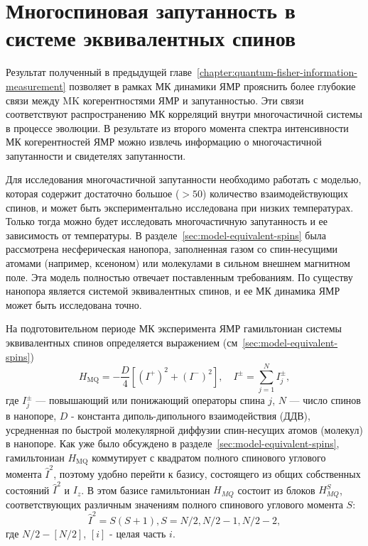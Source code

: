 \chapter{Многоспиновая запутанность в системе эквивалентных спинов}
\label{chapter:manyparticle-entanglement-in-nanopore}
%



Результат полученный в предыдущей главе~\ref{chapter:quantum-fisher-information-measurement}
позволяет в рамках МК динамики ЯМР прояснить более глубокие связи между MK когерентностями ЯМР и запутанностью.
Эти связи соответствуют распространению МК корреляций внутри многочастичной системы в процессе эволюции.
В результате из второго момента спектра интенсивности МК когерентностей ЯМР
можно извлечь информацию о многочастичной запутанности и свидетелях запутанности.

Для исследования многочастичной запутанности необходимо работать с моделью,
которая содержит достаточно большое ($>50$) количество взаимодействующих спинов,
и может быть экспериментально исследована при низких температурах.
Только тогда можно будет исследовать многочастичную запутанность и ее зависимость от температуры.
В разделе~\ref{sec:model-equivalent-spins} была рассмотрена несферическая нанопора,
заполненная газом со спин-несущими атомами (например, ксеноном) или молекулами в сильном внешнем магнитном поле.
Эта модель полностью отвечает поставленным требованиям.
По существу нанопора является системой эквивалентных спинов,
и ее МК динамика ЯМР может быть исследована точно.

На подготовительном периоде МК эксперимента ЯМР гамильтониан системы эквивалентных спинов
определяется выражением (см~\ref{sec:model-equivalent-spins})
\begin{equation}\label{eq:mq-hamiltoninan-equivalent-spins}
  H_\mathrm{MQ} = - \dfrac{D}{4} \left[
    \left( I^{+} \right)^2 + \left( I^{-} \right)^2
  \right],
  \quad
  I^{\pm} = \sum\limits_{j=1}^{N} I^{\pm}_j,
\end{equation}
где $I^{\pm}_{j}$ --- повышающий или понижающий операторы спина $j$,
$N$ --- число спинов в нанопоре,
$D$ - константа диполь-дипольного взаимодействия (ДДВ),
усредненная по быстрой молекулярной диффузии спин-несущих атомов (молекул) в нанопоре.
Как уже было обсуждено в разделе~\ref{sec:model-equivalent-spins},
гамильтониан $H_\mathrm{MQ}$
коммутирует с квадратом полного спинового углового момента $\hat I^2$,
поэтому удобно перейти к базису,
состоящего из общих собственных состояний $\hat I^2$ и $I_z$.
В этом базисе гамильтониан $H_{MQ}$ состоит из блоков $H_{MQ}^S$, соответствующих различным значениям полного спинового углового момента $S$:
\begin{equation}
  \hat I^2 = S(S+1), S = N/2, N/2-1, N/2-2,
\end{equation}
где
$N/2 - [N/2]$, $[i]$ - целая часть $i$.

